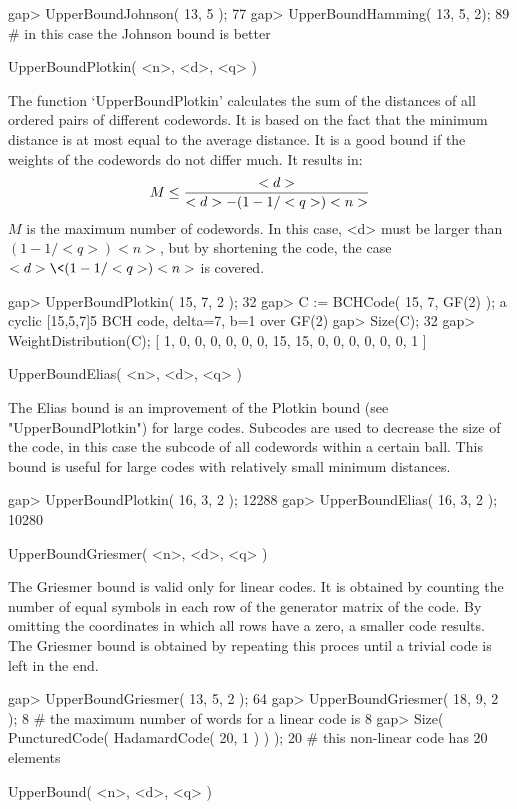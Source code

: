 \beginexample
gap> UpperBoundJohnson( 13, 5 );
77
gap> UpperBoundHamming( 13, 5, 2);
89   # in this case the Johnson bound is better 
\endexample

\>UpperBoundPlotkin( <n>, <d>, <q> )

The function `UpperBoundPlotkin' calculates  the sum of the  distances of
all ordered pairs of  different codewords. It  is based on the  fact that
the  minimum distance is  at most equal to  the average distance. It is a
good bound if the weights of the codewords do not differ much. It results
in: $$M \leq {<d> \over {<d>-(1-1/<q>)<n>}}$$  $M$ is the maximum number
of codewords.  In this case, <d>  must be larger than $(1-1/<q>)<n>$, but
by shortening the code, the case $<d> \< (1-1/<q>)<n>$ is covered.

\beginexample
gap> UpperBoundPlotkin( 15, 7, 2 );
32
gap> C := BCHCode( 15, 7, GF(2) );
a cyclic [15,5,7]5 BCH code, delta=7, b=1 over GF(2)
gap> Size(C);
32
gap> WeightDistribution(C);
[ 1, 0, 0, 0, 0, 0, 0, 15, 15, 0, 0, 0, 0, 0, 0, 1 ] 
\endexample

\>UpperBoundElias( <n>, <d>, <q> )

The  Elias    bound  is   an  improvement  of   the  Plotkin   bound (see
"UpperBoundPlotkin") for large codes. Subcodes  are used to decrease  the
size  of the code, in this  case  the subcode of   all codewords within a
certain ball. This bound is useful  for large codes with relatively small
minimum distances.

\beginexample
gap> UpperBoundPlotkin( 16, 3, 2 );
12288
gap> UpperBoundElias( 16, 3, 2 );
10280 
\endexample

\>UpperBoundGriesmer( <n>, <d>, <q> )

The Griesmer  bound is valid only   for linear codes.  It is  obtained by
counting the number of equal symbols in  each row of the generator matrix
of the code. By omitting the coordinates in which all rows have a zero, a
smaller code  results.  The Griesmer bound  is obtained by repeating this
proces until a trivial code is left in the end.

\beginexample
gap> UpperBoundGriesmer( 13, 5, 2 );
64
gap> UpperBoundGriesmer( 18, 9, 2 );
8        # the maximum number of words for a linear code is 8
gap> Size( PuncturedCode( HadamardCode( 20, 1 ) ) );
20       # this non-linear code has 20 elements 
\endexample

\>UpperBound( <n>, <d>, <q> )


